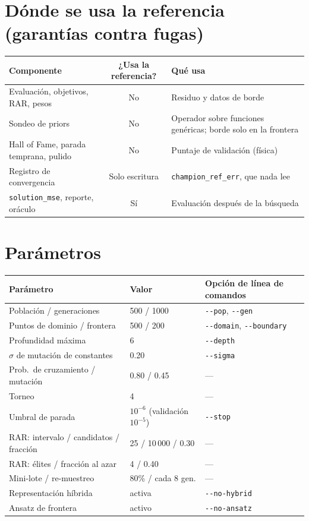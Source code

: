 \documentclass[11pt,a4paper]{article}
\newcommand{\code}[1]{\texttt{\small #1}}
\begin{document}
\section{Dónde se usa la referencia (garantías contra fugas)}
\begin{center}\small
\begin{tabular}{@{}p{6.5cm}cp{6.5cm}@{}}\toprule
Componente & ¿Usa la referencia? & Qué usa\\\midrule
Evaluación, objetivos, RAR, pesos & No & Residuo y datos de borde\\
Sondeo de priors & No & Operador sobre funciones genéricas; borde solo en la frontera\\
Hall of Fame, parada temprana, pulido & No & Puntaje de validación (física)\\
Registro de convergencia & Solo escritura & \code{champion\_ref\_err}, que nada lee\\
\code{solution\_mse}, reporte, oráculo & Sí & Evaluación después de la búsqueda\\\bottomrule
\end{tabular}\end{center}

\section{Parámetros}
\begin{center}\small
\begin{tabular}{@{}lll@{}}\toprule
Parámetro & Valor & Opción de línea de comandos\\\midrule
Población / generaciones & 500 / 1000 & \code{-{}-pop}, \code{-{}-gen}\\
Puntos de dominio / frontera & 500 / 200 & \code{-{}-domain}, \code{-{}-boundary}\\
Profundidad máxima & 6 & \code{-{}-depth}\\
$\sigma$ de mutación de constantes & 0.20 & \code{-{}-sigma}\\
Prob.\ de cruzamiento / mutación & 0.80 / 0.45 & ---\\
Torneo & 4 & ---\\
Umbral de parada & $10^{-6}$ (validación $10^{-5}$) & \code{-{}-stop}\\
RAR: intervalo / candidatos / fracción & 25 / 10\,000 / 0.30 & ---\\
RAR: élites / fracción al azar & 4 / 0.40 & ---\\
Mini-lote / re-muestreo & 80\% / cada 8 gen. & ---\\
Representación híbrida & activa & \code{-{}-no-hybrid}\\
Ansatz de frontera & activo & \code{-{}-no-ansatz}\\\bottomrule
\end{tabular}\end{center}
\end{document}
